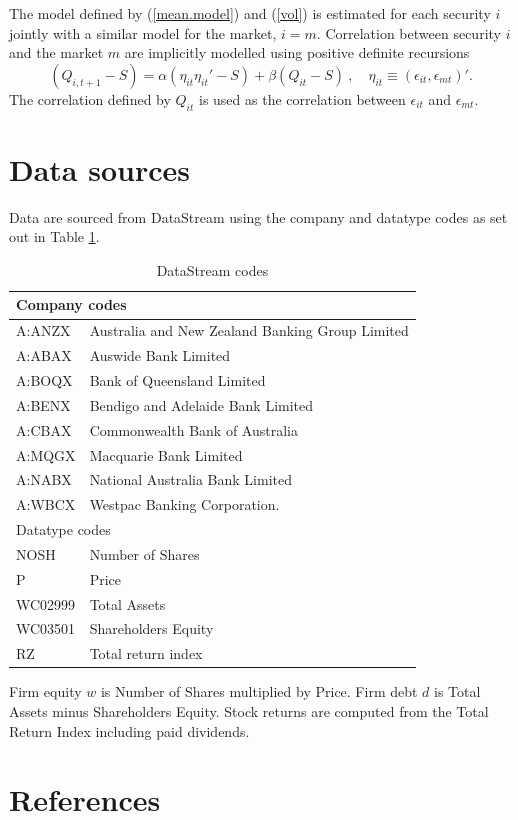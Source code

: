 \documentclass[authoryear]{elsarticle}
\newcommand{\eps}{\epsilon}
\newcommand{\cq}{\ ,\quad }
\newcommand{\eref}[1]{(\ref{#1})}
\newcommand{\tref}[1]{Table \ref{#1}}
\begin{document}
The model defined by \eref{mean.model} and \eref{vol} is estimated  for each security $i$ jointly with  a similar model for  the market,  $i=m$.   Correlation between security $i$ and the market $m$ are implicitly modelled using  positive definite recursions   \citep{engle2002dynamic}
$$
(Q_{i,t+1}-S) = \alpha (\eta_{it}\eta_{it}'-S) + \beta (Q_{it}-S)\cq \eta_{it}\equiv(\eps_{it},\eps_{mt})' .
$$
The correlation defined by $Q_{it}$ is used as the correlation between $\eps_{it}$ and $\eps_{mt}$.


\section{Data sources}\label{data}

Data are sourced from DataStream using the company and datatype codes as set out in \tref{datastream}.

\begin{table}\caption{DataStream codes}\label{datastream}
\begin{center}
	\begin{tabular}{l|l}
	\hline
	\multicolumn{2}{l}{Company codes}\\
	\hline
A:ANZX & Australia and New Zealand Banking Group Limited\\
A:ABAX & Auswide Bank Limited\\
A:BOQX & Bank of Queensland Limited\\
A:BENX & Bendigo and Adelaide Bank Limited\\
A:CBAX & Commonwealth Bank of Australia\\
A:MQGX & Macquarie Bank Limited\\
A:NABX & National Australia Bank Limited\\
A:WBCX & Westpac Banking Corporation.\\
\hline
\multicolumn{2}{l}{Datatype codes}\\
\hline
	NOSH & Number of Shares\\
	P & Price\\
	WC02999 & Total Assets\\
	WC03501 & Shareholders Equity\\
	RZ & Total return index\\
\hline	
\end{tabular}
\end{center}
\end{table}

Firm equity $w$ is Number of Shares multiplied by Price. Firm debt $d$ is Total Assets minus Shareholders Equity. Stock returns are computed from the Total Return Index including paid dividends. 

\newpage
\section{References}

\end{document}
